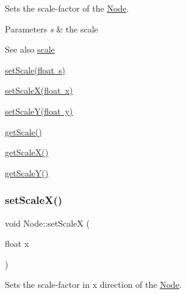 Sets the scale-\/factor of the \mbox{\hyperlink{classsage_1_1Node}{Node}}. 


\begin{DoxyParams}{Parameters}
{\em s} & the scale \\
\hline
\end{DoxyParams}
\begin{DoxySeeAlso}{See also}
\mbox{\hyperlink{classsage_1_1Node_a3014b585d97d3a449e83bc0252db0c50}{scale}} 

\mbox{\hyperlink{classsage_1_1Node_a939698b2eb68ee5b60b91e2426e95369}{set\+Scale(float s)}} 

\mbox{\hyperlink{classsage_1_1Node_ab8126397f90ccdee0755b984b26809d8}{set\+Scale\+X(float x)}} 

\mbox{\hyperlink{classsage_1_1Node_afa22161545d63e9e011f8eeb5acdead7}{set\+Scale\+Y(float y)}} 

\mbox{\hyperlink{classsage_1_1Node_af1a9bc0715acbc80623b5a15a5f65f3f}{get\+Scale()}} 

\mbox{\hyperlink{classsage_1_1Node_a27040ef8ab59ccf42b87d6ddc8d794e6}{get\+Scale\+X()}} 

\mbox{\hyperlink{classsage_1_1Node_ab87661ab8940512baf2e7639ea55ff87}{get\+Scale\+Y()}} 
\end{DoxySeeAlso}
\mbox{\label{classsage_1_1Node_ab8126397f90ccdee0755b984b26809d8}} 
\subsubsection{\texorpdfstring{setScaleX()}{setScaleX()}}
{\footnotesize\ttfamily void Node\+::set\+ScaleX (\begin{DoxyParamCaption}\item[{float}]{x }\end{DoxyParamCaption})}



Sets the scale-\/factor in x direction of the \mbox{\hyperlink{classsage_1_1Node}{Node}}. 


